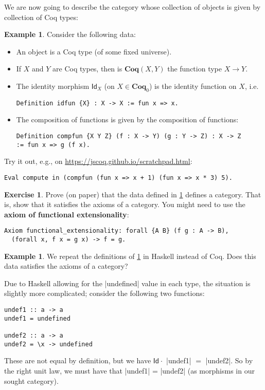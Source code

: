 \documentclass[a4paper,10pt]{scrartcl}
\theoremstyle{plain}
\theoremstyle{definition}
\newtheorem{exa}[thm]{Example}
\newtheorem{exer}[thm]{Exercise}
\newcommand{\cfont}[1]{\ensuremath{\mathsf{#1}}}
\newcommand{\Catb}[1]{\mathbf{#1}}
\newcommand{\COQ}{\Catb{Coq}}
\newcommand{\Ob}[1]{{#1}_0}
\newcommand{\CHom}[3]{{#1}(#2,#3)}
\newcommand{\Id}[1][]{\cfont{Id}_{#1}}
\newcommand{\Comp}{\cdot}
\begin{document}
We are now going to describe the category whose collection of objects is given by collection of Coq types:
\begin{exa}\label{exa:coq-cat}
  Consider the following data: 
\begin{itemize}
\item An object is a Coq type (of some fixed universe).
\item If $X$ and $Y$ are Coq types, then is $\CHom \COQ X Y$ the function type $X\to Y$.
\item The identity morphism $\Id[X]$ (on $X\in \Ob{\COQ}$) is the identity function on $X$, i.e.
\begin{lstlisting}
Definition idfun {X} : X -> X := fun x => x.
\end{lstlisting}
\item The composition of functions is given by the composition of functions:
\begin{lstlisting}
Definition compfun {X Y Z} (f : X -> Y) (g : Y -> Z) : X -> Z
:= fun x => g (f x).
\end{lstlisting}
\end{itemize}
  Try it out, e.g., on \url{https://jscoq.github.io/scratchpad.html}:
\begin{lstlisting}
Eval compute in (compfun (fun x => x + 1) (fun x => x * 3) 5).
\end{lstlisting}  
\end{exa}

\begin{exer}
  Prove (on paper) that the data defined in \cref{exa:coq-cat} defines a category.
  That is, show that it satisfies the axioms of a category.
  You might need to use the \textbf{axiom of functional extensionality}:
\begin{lstlisting}
Axiom functional_extensionality: forall {A B} (f g : A -> B),
  (forall x, f x = g x) -> f = g.
\end{lstlisting}
\end{exer}

\begin{exa}
  We repeat the definitions of \cref{exa:coq-cat} in Haskell instead of Coq.
  Does this data satisfies the axioms of a category?

  Due to Haskell allowing for the |undefined| value in each type, the situation is slightly more complicated; consider the following two functions:
\begin{lstlisting}
undef1 :: a -> a
undef1 = undefined

undef2 :: a -> a
undef2 = \x -> undefined
\end{lstlisting}
These are not equal by definition, but we have $\Id \Comp$ |undef1| $=$ |undef2|.
So by the right unit law, we must have that |undef1| = |undef2| (as morphisms in our sought category).
\end{exa}
\end{document}
